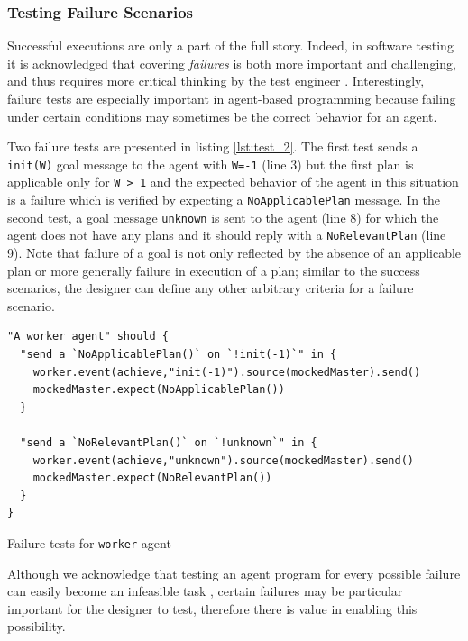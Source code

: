 \subsubsection{Testing Failure Scenarios}
Successful executions are only a part of the full story. Indeed, in software testing it is acknowledged that covering \textit{failures} is both more important and challenging, and thus requires more critical thinking by the test engineer \cite{ArtOfTesting}. Interestingly, failure tests are especially important in agent-based programming because failing under certain conditions may sometimes be the correct behavior for an agent. 

Two failure tests are presented in listing \ref{lst:test_2}. The first test sends a \texttt{init(W)} goal message to the agent with \texttt{W=-1} (line 3) but the first plan is applicable only for \texttt{W > 1} and the expected behavior of the agent in this situation is a failure which is verified by expecting a \texttt{NoApplicablePlan} message. In the second test, a goal message \texttt{unknown} is sent to the agent (line 8) for which the agent does not have any plans and it should reply with a \texttt{NoRelevantPlan} (line 9). Note that failure of a goal is not only reflected by the absence of an applicable plan or more generally failure in execution of a plan; similar to the success scenarios, the designer can define any other arbitrary criteria for a failure scenario.

\begin{listing}[!tb]
\centering
\begin{verbatim}
"A worker agent" should {
  "send a `NoApplicablePlan()` on `!init(-1)`" in {
    worker.event(achieve,"init(-1)").source(mockedMaster).send()
    mockedMaster.expect(NoApplicablePlan())
  } 
  
  "send a `NoRelevantPlan()` on `!unknown`" in {
    worker.event(achieve,"unknown").source(mockedMaster).send()
    mockedMaster.expect(NoRelevantPlan())
  }
}
\end{verbatim}
\vspace{-5pt}
    \caption{Failure tests for \texttt{worker} agent}
    \label{lst:test_2}
\vspace{-5pt}
\end{listing}


Although we acknowledge that testing an agent program for every possible failure can easily become an infeasible task \cite{Winikoff2015,Winikoff2017}, certain failures may be particular important for the designer to test, therefore there is value in enabling this possibility.

